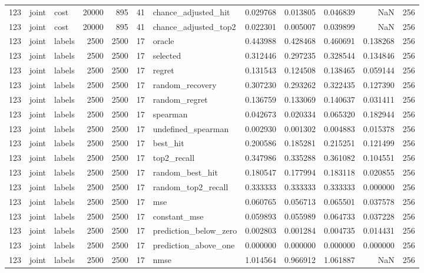 \begin{tabular}{rllrrrlrrrrr}
123 & joint & cost & 20000 & 895 & 41 & chance_adjusted_hit & 0.029768 & 0.013805 & 0.046839 & NaN & 256 \\
123 & joint & cost & 20000 & 895 & 41 & chance_adjusted_top2 & 0.022301 & 0.005007 & 0.039899 & NaN & 256 \\
123 & joint & labels & 2500 & 2500 & 17 & oracle & 0.443988 & 0.428468 & 0.460691 & 0.138268 & 256 \\
123 & joint & labels & 2500 & 2500 & 17 & selected & 0.312446 & 0.297235 & 0.328544 & 0.134846 & 256 \\
123 & joint & labels & 2500 & 2500 & 17 & regret & 0.131543 & 0.124508 & 0.138465 & 0.059144 & 256 \\
123 & joint & labels & 2500 & 2500 & 17 & random_recovery & 0.307230 & 0.293262 & 0.322435 & 0.127390 & 256 \\
123 & joint & labels & 2500 & 2500 & 17 & random_regret & 0.136759 & 0.133069 & 0.140637 & 0.031411 & 256 \\
123 & joint & labels & 2500 & 2500 & 17 & spearman & 0.042673 & 0.020334 & 0.065320 & 0.182944 & 256 \\
123 & joint & labels & 2500 & 2500 & 17 & undefined_spearman & 0.002930 & 0.001302 & 0.004883 & 0.015378 & 256 \\
123 & joint & labels & 2500 & 2500 & 17 & best_hit & 0.200586 & 0.185281 & 0.215251 & 0.121499 & 256 \\
123 & joint & labels & 2500 & 2500 & 17 & top2_recall & 0.347986 & 0.335288 & 0.361082 & 0.104551 & 256 \\
123 & joint & labels & 2500 & 2500 & 17 & random_best_hit & 0.180547 & 0.177994 & 0.183118 & 0.020855 & 256 \\
123 & joint & labels & 2500 & 2500 & 17 & random_top2_recall & 0.333333 & 0.333333 & 0.333333 & 0.000000 & 256 \\
123 & joint & labels & 2500 & 2500 & 17 & mse & 0.060765 & 0.056713 & 0.065501 & 0.037578 & 256 \\
123 & joint & labels & 2500 & 2500 & 17 & constant_mse & 0.059893 & 0.055989 & 0.064733 & 0.037228 & 256 \\
123 & joint & labels & 2500 & 2500 & 17 & prediction_below_zero & 0.002803 & 0.001284 & 0.004735 & 0.014431 & 256 \\
123 & joint & labels & 2500 & 2500 & 17 & prediction_above_one & 0.000000 & 0.000000 & 0.000000 & 0.000000 & 256 \\
123 & joint & labels & 2500 & 2500 & 17 & nmse & 1.014564 & 0.966912 & 1.061887 & NaN & 256 \\

\end{tabular}
